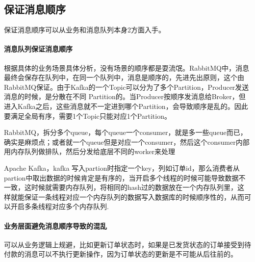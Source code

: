 \documentclass[../../../interview-questions.tex]{subfiles}
\begin{document}
\subsection{保证消息顺序}

保证消息顺序可以从业务和消息队列本身2方面入手。

\paragraph{消息队列保证消息顺序}

根据具体的业务场景具体分析，没有场景的顺序都是耍流氓。RabbitMQ中，消息最终会保存在队列中，在同一个队列中，消息是顺序的，先进先出原则，这个由RabbitMQ保证。由于Kafka的一个Topic可以分为了多个Partition，Producer发送消息的时候，是分散在不同 Partition的。当Producer按顺序发消息给Broker，但进入Kafka之后，这些消息就不一定进到哪个Partition，会导致顺序是乱的。因此要满足全局有序，需要1个Topic只能对应1个Partition。

RabbitMQ，拆分多个queue，每个queue一个consumer，就是多一些queue而已，确实是麻烦点；或者就一个queue但是对应一个consumer，然后这个consumer内部用内存队列做排队，然后分发给底层不同的worker来处理

Apache Kafka，kafka 写入partion时指定一个key，列如订单id，那么消费者从partion中取出数据的时候肯定是有序的，当开启多个线程的时候可能导致数据不一致，这时候就需要内存队列，将相同的hash过的数据放在一个内存队列里，这样就能保证一条线程对应一个内存队列的数据写入数据库的时候顺序性的，从而可以开启多条线程对应多个内存队列.

\paragraph{业务层面避免消息顺序导致的混乱}

可以从业务逻辑上规避，比如更新订单状态时，如果是已发货状态的订单接受到待付款的消息可以不执行更新操作，因为订单状态的更新是不可能从后往前的。
\end{document}
